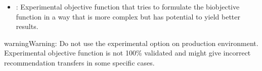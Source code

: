 \documentclass[letterpaper,10pt,english]{sphinxmanual}
\begin{document}
\begin{fulllineitems}
\begin{fulllineitems}
\begin{itemize}
\item {} 
: Experimental objective function that tries to formulate the bi\sphinxhyphen{}objective function in a way that is         more complex but has potential to yield better results.

\end{itemize}

\begin{sphinxadmonition}{warning}{Warning:}
Do not use the experimental option on production environment. Experimental objective function is not 100\% validated and might
give incorrect recommendation transfers in some specific cases.
\end{sphinxadmonition}

\end{fulllineitems}


\end{fulllineitems}

\end{document}
